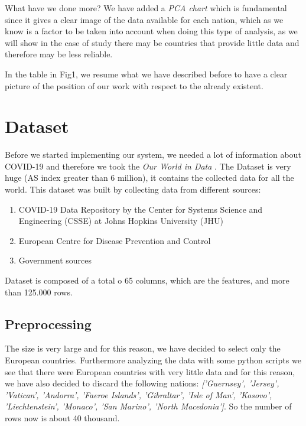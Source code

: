 \documentclass[10pt,conference]{IEEEtran}
\begin{document}
What have we done more? We have added a {\em PCA chart} which is fundamental since it gives a clear image of the data available for 
each nation, which as we know is a factor to be taken into account when doing this type of analysis, as we will show in the case of study 
there may be countries that provide little data and therefore may be less reliable.

In the table in Fig1, we resume what we have described before to have a clear picture of the position of our work with respect to the already existent.

\begin{figure}
\end{figure}

\section{Dataset}
Before we started implementing our system, we needed a lot of information about COVID-19 and therefore we took the 
{\it Our World in Data} \cite{dataset}. The Dataset is very huge (AS index greater than 6 million), it contains the collected data for all the world. 
This dataset was built by collecting data from different sources:
\begin{enumerate}
 \item COVID-19 Data Repository by the Center for Systems Science and Engineering (CSSE) at Johns Hopkins University (JHU)
 \item European Centre for Disease Prevention and Control
 \item Government sources
\end{enumerate}
\bigskip
Dataset is composed of a total o 65 columns, which are the features, and more than 125.000 rows. 

\subsection{Preprocessing}
The size is very large and for this reason, we have decided to select only the European countries. Furthermore analyzing the data with some python scripts we see that there were European countries with very little data and for this reason, we have also decided to discard the following nations:
{\em ['Guernsey', 'Jersey', 'Vatican', 'Andorra', 'Faeroe Islands', 'Gibraltar', 'Isle of Man', 'Kosovo', 'Liechtenstein', 'Monaco', 'San Marino', 'North Macedonia']}. 
So the number of rows now is about 40 thousand. 
\end{document}
